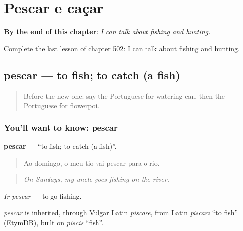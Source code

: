 
\chapter{Pescar e caçar}
\label{ch:pt-pescar-e-cacar}

\begin{chapteropening}
\textbf{By the end of this chapter:} \emph{I can talk about fishing and hunting.}

Complete the last lesson of chapter 502: I can talk about fishing and hunting.
\end{chapteropening}

\section[pescar]{pescar — to fish; to catch (a fish)}

\label{lesson:PT-C502-pescar}



\begin{quote}
Before the new one: say the Portuguese for watering can, then the Portuguese for flowerpot.
\end{quote}

\subsection*{You'll want to know: pescar}
\textbf{pescar} — \textquotedblleft{}to fish; to catch (a fish)\textquotedblright{}.

\begin{quote}
Ao domingo, o meu tio vai pescar para o rio.
\end{quote}

\begin{quote}
\emph{On Sundays, my uncle goes fishing on the river.}
\end{quote}

\emph{Ir pescar} — to go fishing.

\begin{cousinweb}
\emph{pescar} is inherited, through Vulgar Latin \emph{piscāre}, from Latin \emph{piscārī} \textquotedblleft{}to fish\textquotedblright{} (EtymDB), built on \emph{piscis} \textquotedblleft{}fish\textquotedblright{}.
\end{cousinweb}

